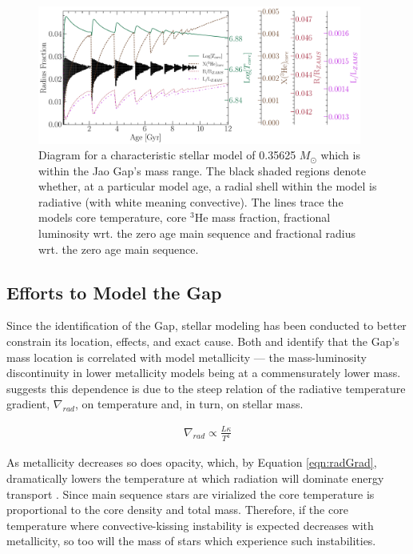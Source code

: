 \begin{figure}
	\centering
	\includegraphics[width=0.95\textwidth]{figures/jaoOpacity/Kippenhan.pdf}
	\caption{Diagram for a characteristic stellar model of 0.35625 $M_{\odot}$
	which is within the Jao Gap's mass range. The black shaded regions denote
	whether, at a particular model age, a radial shell within the model is
	radiative (with white meaning convective). The lines trace the models core
	temperature, core $^{3}$He mass fraction, fractional luminosity wrt. the
	zero age main sequence and fractional radius wrt. the zero age main
	sequence.}
	\label{fig:Kippenhan1}
\end{figure}


\subsection{Efforts to Model the Gap}
Since the identification of the Gap, stellar modeling has been
conducted to better constrain its location, effects, and exact cause.
Both \citet{Mansfield2021} and \citet{Feiden2021} identify that the Gap's mass
location is correlated with model metallicity --- the mass-luminosity
discontinuity in lower metallicity models being at a commensurately lower mass.
\citet{Feiden2021} suggests this dependence is due to the steep relation of
the radiative temperature gradient, $\nabla_{rad}$, on temperature and, in turn,
on stellar mass.

\begin{align}\label{eqn:radGrad}
	\nabla_{rad} \propto \frac{L\kappa}{T^{4}}
\end{align}

As metallicity decreases so does opacity, which, by Equation \ref{eqn:radGrad},
dramatically lowers the temperature at which radiation will dominate energy
transport \citep{Chabrier1997}. Since main sequence stars are virialized the
core temperature is proportional to the core density and total mass. Therefore,
if the core temperature where convective-kissing instability is expected
decreases with metallicity, so too will the mass of stars which experience such
instabilities.

